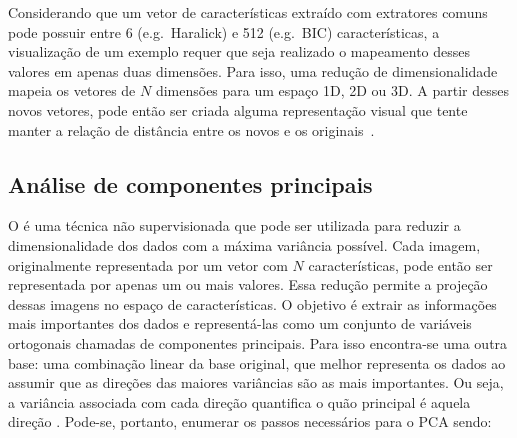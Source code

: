 Considerando que um vetor de características extraído com extratores comuns pode possuir entre 6 (e.g.\ Haralick) e 512 (e.g.\ BIC) características, a visualização de um exemplo requer que seja realizado o mapeamento desses valores em apenas duas dimensões. Para isso, uma redução de dimensionalidade mapeia os vetores de $N$ dimensões para um espaço 1D, 2D ou 3D. A partir desses novos vetores, pode então ser criada alguma representação visual que tente manter a relação de distância entre os novos e os originais~\cite{Paulovich2007}.

\subsection{Análise de componentes principais}
\label{sec:pca}


O  é uma técnica não supervisionada que pode ser utilizada para reduzir a dimensionalidade dos dados com a máxima variância possível. Cada imagem, originalmente representada por um vetor com $N$ características, pode então ser representada por apenas um ou mais valores. Essa redução permite a projeção dessas imagens no espaço de características. O objetivo é extrair as informações mais importantes dos dados e representá-las como um conjunto de variáveis ortogonais chamadas de componentes principais. Para isso encontra-se uma outra base: uma combinação linear da base original, que melhor representa os dados ao assumir que as direções das maiores variâncias são as mais importantes. Ou seja, a variância associada com cada direção quantifica o quão principal é aquela direção \cite{Abdi2010}. Pode-se, portanto, enumerar os passos necessários para o PCA sendo:


